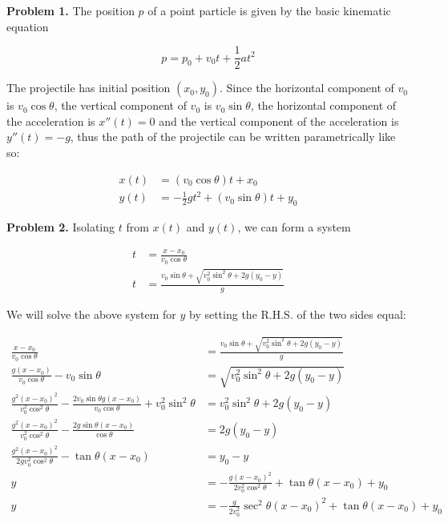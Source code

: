 \documentclass{article}
\begin{document}
    \textbf{Problem 1.} The position $p$ of a point particle is given by the basic kinematic equation

    \[
        p = p_0 + v_0 t + \frac{1}{2}at^2
    \]

    The projectile has initial position $\left(x_0,y_0\right)$. Since the horizontal component of $v_0$ is $v_0\cos{\theta}$, the vertical component of $v_0$ is $v_0\sin{\theta}$, the horizontal component of the
    acceleration is $x''(t)=0$ and the vertical component of the acceleration is $y''(t) = -g$, thus the path of the projectile can be written parametrically like so:

    \begin{align*}
        x(t) &= \left(v_0 \cos{\theta}\right) t + x_0 \\
        y(t) &= -\frac{1}{2}gt^2 + \left(v_0 \sin{\theta}\right)t + y_0
    \end{align*}

    \pagebreak
    \thispagestyle{3}

    \textbf{Problem 2.} Isolating $t$ from $x(t)$ and $y(t)$, we can form a system

    \begin{align*}
        t   &= \frac{x-x_0}{v_0 \cos{\theta}} \\
        t   &= \frac{v_0 \sin{\theta}+\sqrt{v_0^2 \sin^2{\theta} +2g(y_0 - y)}}{g}
    \end{align*}

    We will solve the above system for $y$ by setting the R.H.S. of the two sides equal:

    \begin{align*}
        \frac{x-x_0}{v_0 \cos{\theta}}  &= \frac{v_0 \sin{\theta}+\sqrt{v_0^2 \sin^2{\theta} +2g(y_0 - y)}}{g} \\
        \frac{g(x-x_0)}{v_0 \cos{\theta}} - v_0\sin{\theta} &= \sqrt{v_0^2\sin^2{\theta} + 2g(y_0 - y)} \\
        \frac{g^2\left(x-x_0\right)^2}{v_0^2\cos^2{\theta}} - \frac{2v_0\sin{\theta}g(x-x_0)}{v_0 \cos{\theta}} + v_0^2 \sin^2{\theta}  &= v_0^2 \sin^2{\theta} + 2g(y_0-y) \\
        \frac{g^2\left(x-x_0\right)^2}{v_0^2\cos^2{\theta}} - \frac{2g\sin{\theta}(x-x_0)}{\cos{\theta}}    &= 2g(y_0-y) \\
        \frac{g^2\left(x-x_0\right)^2}{2gv_0^2\cos^2{\theta}} - \tan{\theta}\left(x-x_0\right)  &= y_0 - y \\
        y   &= -\frac{g(x-x_0)^2}{2v_0^2\cos^2{\theta}} + \tan{\theta}(x-x_0) + y_0 \\
        y &= -\frac{g}{2v_0^2}\sec^2{\theta}\left(x-x_0\right)^2+ \tan{\theta}\left(x-x_0\right) + y_0
    \end{align*}
\end{document}
